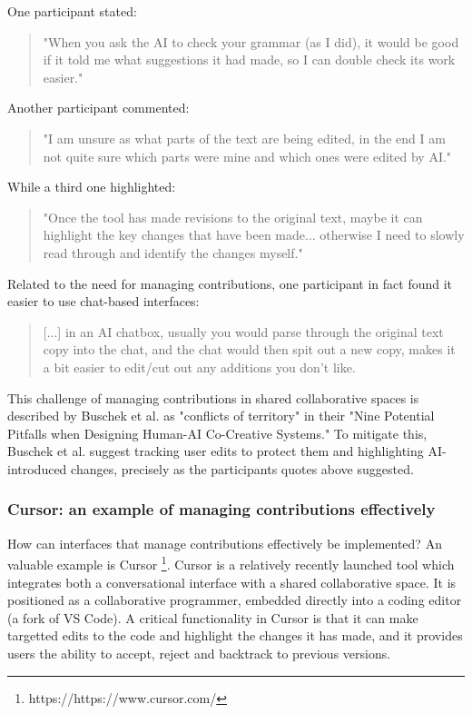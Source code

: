One participant stated:
\begin{quote}
 "When you ask the AI to check your grammar (as I did), it would be good if it told me what suggestions it had made, so I can double check its work easier."
\end{quote}

Another participant commented:
\begin{quote}
    "I am unsure as what parts of the text are being edited, in the end I am not quite sure which parts were mine and which ones were edited by AI."
\end{quote}

While a third one highlighted: 

\begin{quote}
"Once the tool has made revisions to the original text, maybe it can highlight the key changes that have been made... otherwise I need to slowly read through and identify the changes myself."
\end{quote}

Related to the need for managing contributions, one participant in fact found it easier to use chat-based interfaces:
\begin{quote}
[...] in an AI chatbox, usually you would parse through the original text copy into the chat, and the chat would then spit out a new copy, makes it a bit easier to edit/cut out any additions you don't like.
\end{quote}

This challenge of managing contributions in shared collaborative spaces is described by Buschek et al. \cite{Buschek2021-ks} as "conflicts of territory" in their "Nine Potential Pitfalls when Designing Human-AI Co-Creative Systems." To mitigate this, Buschek et al. suggest tracking user edits to protect them and highlighting AI-introduced changes, precisely as the participants quotes above suggested.

\subsubsection{Cursor: an example of managing contributions effectively}

How can interfaces that manage contributions effectively be implemented? An valuable example is Cursor \footnote{https://https://www.cursor.com/}. Cursor is a relatively recently launched tool which integrates both a conversational interface with a shared collaborative space. It is positioned as a collaborative programmer, embedded directly into a coding editor (a fork of VS Code). A critical functionality in Cursor is that it can make targetted edits to the code and highlight the changes it has made, and it provides users the ability to accept, reject and backtrack to previous versions. 

